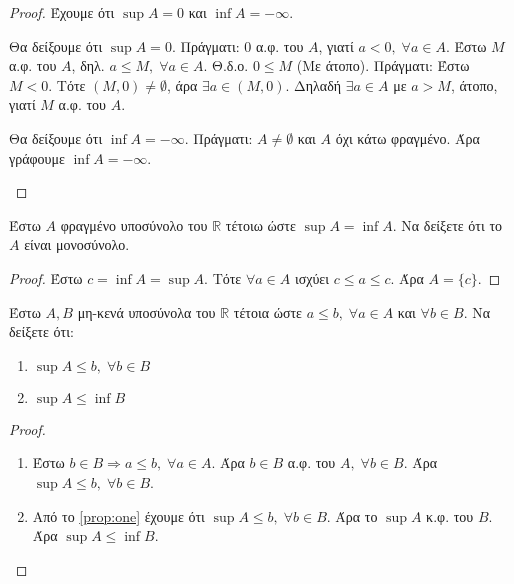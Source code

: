 \documentclass[a4paper,table]{report}
\begin{document}
\begin{multicols}{2}
\begin{enumerate}
\begin{enumerate}
\begin{proof}
          Έχουμε ότι $ \sup A = 0 $ και $ \inf A = - \infty $.
          \begin{myitemize}
            \item Θα δείξουμε ότι $ \sup A = 0 $. Πράγματι:
              $ 0 $ α.φ. του $A$, γιατί $ a < 0, \; \forall a \in A $.
              Έστω $M$ α.φ. του $A$, δηλ. $a \leq M, \; \forall a \in A $.
              Θ.δ.ο. $ 0 \leq M $ (Με άτοπο). Πράγματι:
              Έστω $ M < 0 $. Τότε $ (M,0) \neq \emptyset $, άρα 
              $ \exists a \in (M,0) $.
              Δηλαδή $ \exists a \in A $ με $ a > M $, 
              άτοπο, γιατί $ M $ α.φ. του $A$.
            \item Θα δείξουμε ότι $ \inf A = -\infty $. Πράγματι:
              $ A \neq \emptyset $ και $A$ όχι κάτω φραγμένο. Άρα γράφουμε
              $ \inf A = - \infty $.
          \end{myitemize}
        \end{proof}
\end{enumerate} 

    \item \textcolor{Col1}{Έστω $A$ φραγμένο υποσύνολο του $ \mathbb{R} $ τέτοιω ώστε 
      $ \sup A = \inf A $.  Να δείξετε ότι το $A$ είναι μονοσύνολο.}
      \begin{proof}
        Έστω $ c = \inf A = \sup A $. Τότε $ \forall a \in A $ ισχύει $ c \leq a \leq c
        $. Άρα $ A = \{ c \} $.
      \end{proof}

    \item \textcolor{Col1}{Έστω $ A, B $ μη-κενά υποσύνολα του $ \mathbb{R} $ 
        τέτοια ώστε $ a \leq b, \; \forall a \in A $ και $ \forall b \in B $.
        Να δείξετε ότι:
        \begin{enumerate}
          \item $ \sup A \leq b, \;  \forall b \in B $
          \item $ \sup A \leq \inf B $
      \end{enumerate}}
      \begin{proof}
      \item {}
        \begin{enumerate}
          \item \label{prop:one} Έστω $ b \in B \Rightarrow a \leq b, \; 
            \forall a \in A $. 
            Άρα $ b \in B $ α.φ. του $A, \; \forall b \in B$. Άρα 
            $ \sup A \leq b, \; \forall b \in B $.
          \item Από το \ref{prop:one} έχουμε ότι $ \sup A \leq b, \; \forall 
            b \in B$. Άρα το $ \sup A $ κ.φ. του $B$. Άρα $ \sup A \leq 
            \inf B$.
        \end{enumerate}
      \end{proof}


\end{enumerate}
\end{multicols}
\end{document}
